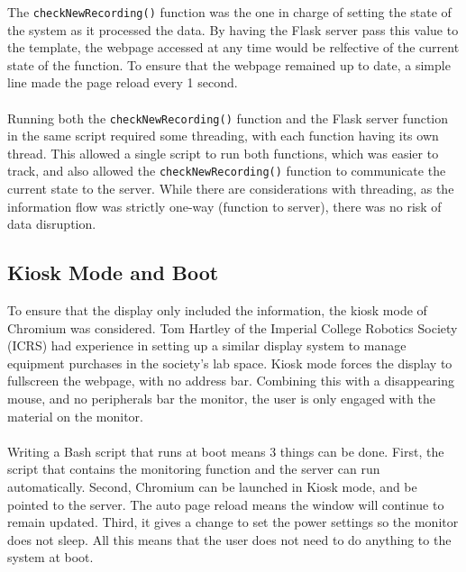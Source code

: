 \documentclass[main.tex]{subfiles}
\begin{document}
The \texttt{checkNewRecording()} function was the one in charge of setting the state of the system as it processed the data. By having the Flask server pass this value to the template, the webpage accessed at any time would be relfective of the current state of the function. To ensure that the webpage remained up to date, a simple line made the page reload every 1 second.
\\\\
Running both the \texttt{checkNewRecording()} function and the Flask server function in the same script required some threading, with each function having its own thread. This allowed a single script to run both functions, which was easier to track, and also allowed the \texttt{checkNewRecording()} function to communicate the current state to the server. While there are considerations with threading, as the information flow was strictly one-way (function to server), there was no risk of data disruption.

\subsection{Kiosk Mode and Boot}
To ensure that the display only included the information, the kiosk mode of Chromium was considered. Tom Hartley of the Imperial College Robotics Society (ICRS) had experience in setting up a similar display system to manage equipment purchases in the society's lab space. Kiosk mode forces the display to fullscreen the webpage, with no address bar. Combining this with a disappearing mouse, and no peripherals bar the monitor, the user is only engaged with the material on the monitor.
\\\\
Writing a Bash script that runs at boot means 3 things can be done. First, the script that contains the monitoring function and the server can run automatically. Second, Chromium can be launched in Kiosk mode, and be pointed to the server. The auto page reload means the window will continue to remain updated. Third, it gives a change to set the power settings so the monitor does not sleep. All this means that the user does not need to do anything to the system at boot.
\end{document}
